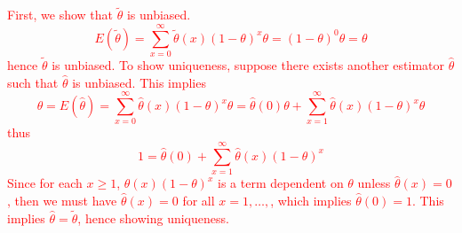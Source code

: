 \documentclass[12pt]{article}
\newcommand{\1}{\mathds 1}
\begin{document}
\begin{enumerate}
\textcolor{red}{
    First, we show that $\tilde\theta$ is unbiased. 
    \begin{equation*}
        E(\tilde\theta) = \sum_{x=0}^\infty \tilde\theta(x)(1-\theta)^x\theta = (1-\theta)^0\theta = \theta
    \end{equation*}
    hence $\tilde \theta$ is unbiased. 
    To show uniqueness, suppose there exists another estimator $\hat\theta$ such that $\hat\theta$ is unbiased. This implies 
    \begin{equation*}
        \theta = E(\hat\theta) = \sum_{x=0}^\infty \hat\theta(x) (1-\theta)^x \theta = \hat\theta(0)\theta + \sum_{x=1}^\infty \hat\theta(x)(1-\theta)^x\theta
    \end{equation*}
    thus 
    \begin{equation*}
        1 = \hat\theta(0) + \sum_{x=1}^\infty \hat\theta(x) (1-\theta)^x
    \end{equation*}
    Since for each $x \geq 1$, $\hat\theta(x)(1-\theta)^x$ is a term dependent on $\theta$ unless $\hat\theta(x) = 0$, then we must have $\hat\theta(x) = 0$ for all $x = 1,\ldots,$, which implies $\hat\theta(0) = 1$. This implies $\hat\theta = \tilde\theta$, hence showing uniqueness. 
}
\end{enumerate}
\end{document}

